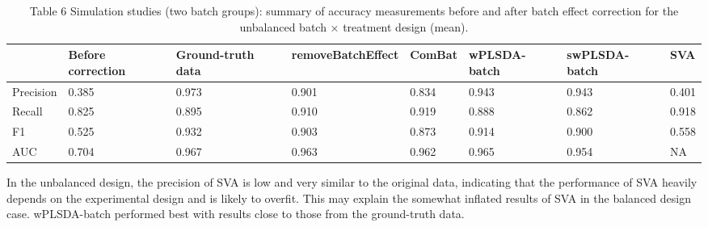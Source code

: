 \documentclass[
]{book}
\begin{document}
\begin{table}

\caption{\label{tab:unnamed-chunk-121}Table 6 Simulation studies (two batch groups): summary of accuracy measurements before and after batch effect correction for the unbalanced batch × treatment design (mean).}
\centering
\begin{tabular}[t]{l|l|l|l|l|l|l|l}
\hline
  & Before correction & Ground-truth data & removeBatchEffect & ComBat & wPLSDA-batch & swPLSDA-batch & SVA\\
\hline
Precision & 0.385 & 0.973 & 0.901 & 0.834 & 0.943 & 0.943 & 0.401\\
\hline
Recall & 0.825 & 0.895 & 0.910 & 0.919 & 0.888 & 0.862 & 0.918\\
\hline
F1 & 0.525 & 0.932 & 0.903 & 0.873 & 0.914 & 0.900 & 0.558\\
\hline
AUC & 0.704 & 0.967 & 0.963 & 0.962 & 0.965 & 0.954 & NA\\
\hline
\end{tabular}
\end{table}

In the unbalanced design, the precision of SVA is low and very similar to the original data, indicating that the performance of SVA heavily depends on the experimental design and is likely to overfit. This may explain the somewhat inflated results of SVA in the balanced design case. wPLSDA-batch performed best with results close to those from the ground-truth data.
\end{document}
